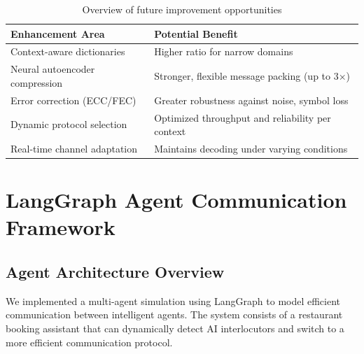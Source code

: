 \documentclass[12pt,openany]{article}
\theoremstyle{definition}
\theoremstyle{definition}
\theoremstyle{definition}
\begin{document}
\begin{table}[h]
\centering
\begin{tabular}{|l|l|}
\hline
\textbf{Enhancement Area}       & \textbf{Potential Benefit} \\
\hline
Context-aware dictionaries      & Higher ratio for narrow domains     \\
Neural autoencoder compression  & Stronger, flexible message packing (up to 3×) \\
Error correction (ECC/FEC)      & Greater robustness against noise, symbol loss \\
Dynamic protocol selection      & Optimized throughput and reliability per context \\
Real-time channel adaptation    & Maintains decoding under varying conditions \\
\hline
\end{tabular}
\caption{Overview of future improvement opportunities}
\end{table}


\newpage



\section*{LangGraph Agent Communication Framework}
\subsection*{Agent Architecture Overview}
We implemented a multi-agent simulation using LangGraph \cite{langgraph} to model efficient communication between intelligent agents. The system consists of a restaurant booking assistant that can dynamically detect AI interlocutors and switch to a more efficient communication protocol.

\vspace{2cm} 
\begin{figure}[h]
\centering
{}
\end{figure}
\end{document}
